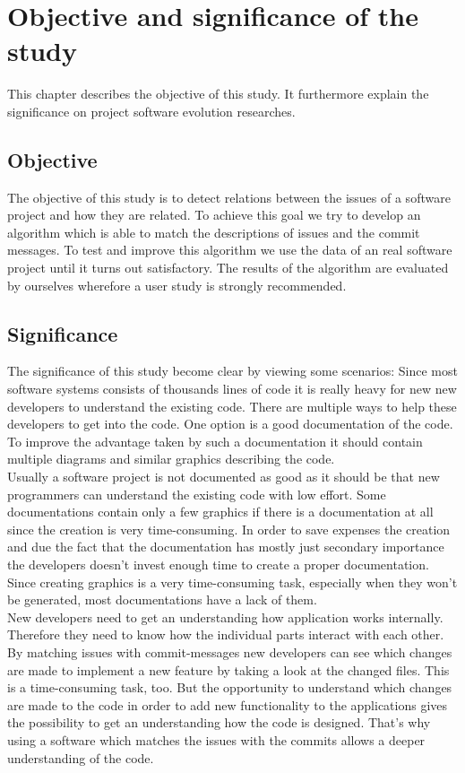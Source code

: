 \newpage
\section{Objective and significance of the study}
\label{sec:objective}
This chapter describes the objective of this study. It furthermore explain the significance on project software evolution researches.

\subsection{Objective}

The objective of this study is to detect relations between the issues of a software project and how they
are related. To achieve this goal we try to develop an algorithm which is able to match the descriptions
of issues and the commit messages. To test and improve this algorithm we use the data of an real software
project until it turns out satisfactory. The results of the algorithm are evaluated by ourselves wherefore
a user study is strongly recommended.

\subsection{Significance}
The significance of this study become clear by viewing some scenarios:
Since most software systems consists of thousands lines of code it is really heavy for new new developers
to understand the existing code. There are multiple ways to help these developers to get into the code.
One option is a good documentation of the code. To improve the advantage taken by such a documentation it
should contain multiple diagrams and similar graphics describing the code.\\

Usually a software project is not documented as good as it should be that new programmers can understand
the existing code with low effort. Some documentations contain only a few graphics if there is a
documentation at all since the creation is very time-consuming. In order to save expenses the creation and
due the fact that the documentation has mostly just secondary importance the developers doesn't invest
enough time to create a proper documentation. Since creating graphics is a very time-consuming task,
especially when they won't be generated, most documentations have a lack of them.\\

New developers need to get an understanding how application works internally. Therefore they need to know
how the individual parts interact with each other. 
By matching issues with commit-messages new developers can see which changes are made to implement a new
feature by taking a look at the changed files. This is a time-consuming task, too. But the opportunity to
understand which changes are made to the code in order to add new functionality to the applications gives
the possibility to get an understanding how the code is designed. That's why using a software which
matches the issues with the commits allows a deeper understanding of the code.


